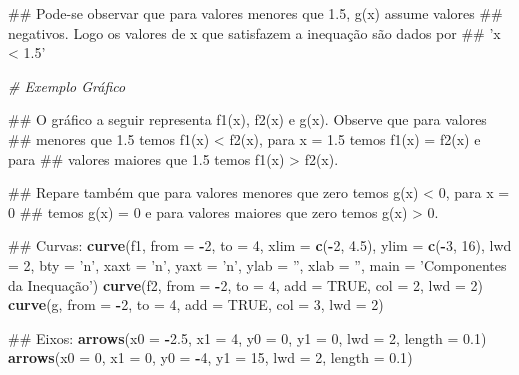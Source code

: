 \documentclass[]{book}
\newenvironment{Shaded}{\begin{snugshade}}{\end{snugshade}}
\newcommand{\KeywordTok}[1]{\textcolor[rgb]{0.13,0.29,0.53}{\textbf{#1}}}
\newcommand{\DataTypeTok}[1]{\textcolor[rgb]{0.13,0.29,0.53}{#1}}
\newcommand{\DecValTok}[1]{\textcolor[rgb]{0.00,0.00,0.81}{#1}}
\newcommand{\FloatTok}[1]{\textcolor[rgb]{0.00,0.00,0.81}{#1}}
\newcommand{\StringTok}[1]{\textcolor[rgb]{0.31,0.60,0.02}{#1}}
\newcommand{\CommentTok}[1]{\textcolor[rgb]{0.56,0.35,0.01}{\textit{#1}}}
\newcommand{\OtherTok}[1]{\textcolor[rgb]{0.56,0.35,0.01}{#1}}
\newcommand{\OperatorTok}[1]{\textcolor[rgb]{0.81,0.36,0.00}{\textbf{#1}}}
\newcommand{\NormalTok}[1]{#1}
\begin{document}
\begin{Shaded}
\begin{Highlighting}[]
\NormalTok{##  Pode-se observar que para valores menores que 1.5, g(x) assume valores}
\NormalTok{## negativos. Logo os valores de x que satisfazem a inequação são dados por}
\NormalTok{## 'x < 1.5'}

\CommentTok{# Exemplo Gráfico}

\NormalTok{##  O gráfico a seguir representa f1(x), f2(x) e g(x). Observe que para valores}
\NormalTok{## menores que 1.5 temos f1(x) < f2(x), para x = 1.5 temos f1(x) = f2(x) e para}
\NormalTok{## valores maiores que 1.5 temos f1(x) > f2(x).}

\NormalTok{##  Repare também que para valores menores que zero temos g(x) < 0, para x = 0}
\NormalTok{## temos g(x) = 0 e para valores maiores que zero temos g(x) > 0.}

\NormalTok{##  Curvas:}
\KeywordTok{curve}\NormalTok{(f1, }\DataTypeTok{from =} \OperatorTok{-}\DecValTok{2}\NormalTok{, }\DataTypeTok{to =} \DecValTok{4}\NormalTok{, }\DataTypeTok{xlim =} \KeywordTok{c}\NormalTok{(}\OperatorTok{-}\DecValTok{2}\NormalTok{, }\FloatTok{4.5}\NormalTok{), }\DataTypeTok{ylim =} \KeywordTok{c}\NormalTok{(}\OperatorTok{-}\DecValTok{3}\NormalTok{, }\DecValTok{16}\NormalTok{), }\DataTypeTok{lwd =} \DecValTok{2}\NormalTok{,}
      \DataTypeTok{bty =} \StringTok{'n'}\NormalTok{, }\DataTypeTok{xaxt =} \StringTok{'n'}\NormalTok{, }\DataTypeTok{yaxt =} \StringTok{'n'}\NormalTok{, }\DataTypeTok{ylab =} \StringTok{''}\NormalTok{, }\DataTypeTok{xlab =} \StringTok{''}\NormalTok{,}
      \DataTypeTok{main =} \StringTok{'Componentes da Inequação'}\NormalTok{)}
\KeywordTok{curve}\NormalTok{(f2, }\DataTypeTok{from =} \OperatorTok{-}\DecValTok{2}\NormalTok{, }\DataTypeTok{to =} \DecValTok{4}\NormalTok{, }\DataTypeTok{add =} \OtherTok{TRUE}\NormalTok{, }\DataTypeTok{col =} \DecValTok{2}\NormalTok{, }\DataTypeTok{lwd =} \DecValTok{2}\NormalTok{)}
\KeywordTok{curve}\NormalTok{(g, }\DataTypeTok{from =} \OperatorTok{-}\DecValTok{2}\NormalTok{, }\DataTypeTok{to =} \DecValTok{4}\NormalTok{, }\DataTypeTok{add =} \OtherTok{TRUE}\NormalTok{, }\DataTypeTok{col =} \DecValTok{3}\NormalTok{, }\DataTypeTok{lwd =} \DecValTok{2}\NormalTok{)}

\NormalTok{##  Eixos:}
\KeywordTok{arrows}\NormalTok{(}\DataTypeTok{x0 =} \OperatorTok{-}\FloatTok{2.5}\NormalTok{, }\DataTypeTok{x1 =} \DecValTok{4}\NormalTok{,}
       \DataTypeTok{y0 =} \DecValTok{0}\NormalTok{, }\DataTypeTok{y1 =} \DecValTok{0}\NormalTok{, }\DataTypeTok{lwd =} \DecValTok{2}\NormalTok{, }\DataTypeTok{length =} \FloatTok{0.1}\NormalTok{)}
\KeywordTok{arrows}\NormalTok{(}\DataTypeTok{x0 =} \DecValTok{0}\NormalTok{, }\DataTypeTok{x1 =} \DecValTok{0}\NormalTok{,}
       \DataTypeTok{y0 =} \OperatorTok{-}\DecValTok{4}\NormalTok{, }\DataTypeTok{y1 =} \DecValTok{15}\NormalTok{, }\DataTypeTok{lwd =} \DecValTok{2}\NormalTok{, }\DataTypeTok{length =} \FloatTok{0.1}\NormalTok{)}


\end{Highlighting}
\end{Shaded}
\end{document}
